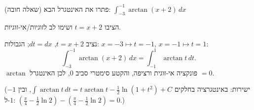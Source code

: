 
\begin{question}
(שאלה חובה)
פתרו את האינטגרל הבא:
$\displaystyle\int_{-3}^{-1}\arctan(x+2)\,dx$
\end{question}

\begin{hint}
הציבו $t=x+2$ ושימו לב לזוגיות/אי-זוגיות.
\end{hint}

\begin{solution}
נציב $t=x+2$, $dt=dx$; הגבולות: $x=-3\mapsto t=-1$, $x=-1\mapsto t=1$:
\[ \int_{-3}^{-1}\arctan(x+2)\,dx=\int_{-1}^{1}\arctan t\,dt. \]
$\arctan$ פונקציה אי-זוגית ורציפה, והקטע סימטרי סביב $0$, לכן האינטגרל $\boxed{=0}$.

(ישירות: באינטגרציה בחלקים $\int\arctan t\,dt=t\arctan t-\frac12\ln(1+t^2)+C$, ובין $-1$ ל-$1$: $\left(\frac\pi4-\frac12\ln2\right)-\left(\frac\pi4-\frac12\ln2\right)=0$.)
\end{solution}
